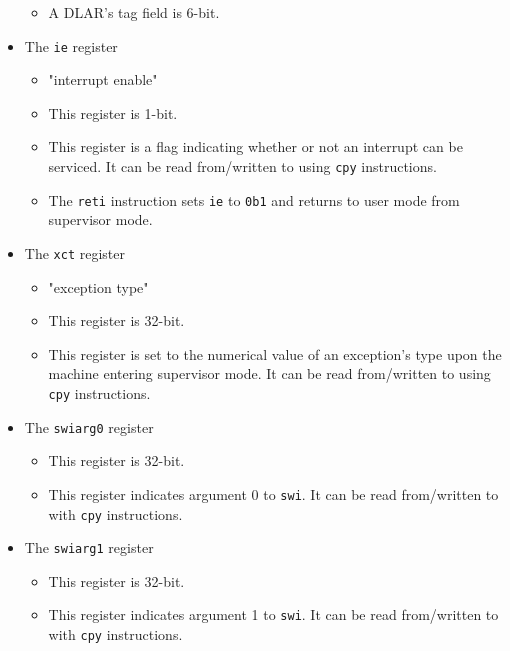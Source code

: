 \documentclass{article}
\begin{document}
\begin{itemize}
\begin{itemize}
		\item A DLAR's tag field is 6-bit.
		\end{itemize}

	\item The \texttt{ie} register
		\begin{itemize}
		\item "interrupt enable"

		\item This register is 1-bit.

		\item This register is a flag indicating whether or not an
		interrupt can be serviced.  It can be read from/written to using
		\texttt{cpy} instructions.

		\item The \texttt{reti} instruction sets \texttt{ie} to
		\texttt{0b1} and returns to user mode from supervisor mode.
		\end{itemize}

	\item The \texttt{xct} register
		\begin{itemize}
		\item "exception type"

		\item This register is 32-bit.

		\item This register is set to the numerical value of an exception's
		type upon the machine entering supervisor mode.  It can be read
		from/written to using \texttt{cpy} instructions.
		\end{itemize}

	\item The \texttt{swiarg0} register
		\begin{itemize}
		\item This register is 32-bit.

		\item This register indicates argument 0 to \texttt{swi}.  It can
		be read from/written to with \texttt{cpy} instructions.
		\end{itemize}

	\item The \texttt{swiarg1} register
		\begin{itemize}
		\item This register is 32-bit.

		\item This register indicates argument 1 to \texttt{swi}.  It can
		be read from/written to with \texttt{cpy} instructions.
		\end{itemize}


\end{itemize}
\end{document}

